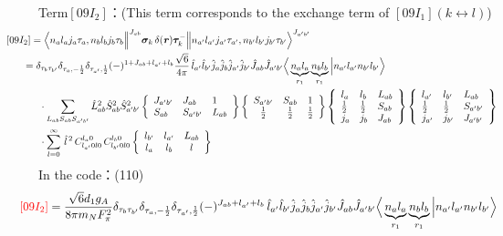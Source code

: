 \documentclass[master]{shnuthesis}
\newcommand{\bmr}{\textbf{\textit{r}}}
\newcommand{\ap}{a^\prime}
\newcommand{\bp}{b^\prime}
\newcommand{\il}{\!\!\!\!\!\!\!\!\!\!}
\newcommand{\ii}{\!\!\!\!\!\!\!\!\!\!\!\!\!\!\!\!\!\!\!\!}
\begin{document}
{\color{red}Term$[09I_2]$：}(This term corresponds to the exchange term of $[09I_1]$$(k \longleftrightarrow l)$)
\begin{align}
    &\ii [09I_2] = \Big\langle n_a l_a j_a \tau_a, n_b l_b j_b \tau_b \Big\|^{J_{ab}} \bm{\sigma}_k \,\delta(\bmr) \bm{\tau}_k^- \Big\| n_{\ap} l_{\ap} j_{\ap} \tau_{\ap}, n_{\bp} l_{\bp} j_{\bp} \tau_{\bp} \Big\rangle^{J_{\ap \bp}} \\
    &\il = \delta_{\tau_b \tau_{\bp}}\delta_{\tau_a, -\frac{1}{2}}\delta_{\tau_{\ap}, \frac{1}{2}} (-)^{1+J_{ab}+l_{\ap}+l_b}\frac{\sqrt{6}}{4\pi}\,\hat{l}_{\ap}\hat{l}_{\bp}\hat{j}_a\hat{j}_b\hat{j}_{\ap}\hat{j}_{\bp}\hat{J}_{ab}\hat{J}_{\ap\bp} \Big\langle \underbrace{n_a l_a}_{r_1} \underbrace{n_b l_b}_{r_1} \Big| n_{\ap} l_{\ap} n_{\bp} l_{\bp} \Big\rangle \notag \\
    & \cdot \sum_{L_{ab}S_{ab}S_{\ap\bp}} \hat{L}_{ab}^2\hat{S}_{ab}^2\hat{S}_{\ap\bp}^2  \left\{\begin{array}{lll} J_{\ap\bp} & J_{ab} & 1 \\ S_{ab} & S_{\ap\bp} & L_{ab} \end{array}\right\}    \left\{\begin{array}{ccc} S_{\ap\bp} & S_{ab} & 1 \\ \frac{1}{2} & \frac{1}{2} & \frac{1}{2} \end{array}\right\}  \left\{\begin{array}{lll}l_{a} & l_{b} & L_{ab} \\ \frac{1}{2} & \frac{1}{2} & S_{ab} \\j_{a} & j_{b} & J_{ab} \end{array}\right\}  \left\{\begin{array}{lll}l_{\ap} & l_{\bp} & L_{ab} \\ \frac{1}{2} & \frac{1}{2} & S_{\ap\bp} \\j_{\ap} & j_{\bp} & J_{\ap\bp} \end{array}\right\}  \notag\\
    & \cdot \sum_{l=0}^\infty \,\hat{l}^{\,2}\,C_{l_{\ap} 0 l 0}^{l_a 0} \,C_{l_{\bp} 0 l 0}^{l_b 0}  \left\{\begin{array}{ccc} l_{\bp} & l_{\ap} & L_{ab} \\ l_a & l_b & l \end{array}\right\}
\end{align}
In the code：(110)
\begin{align}
    &\il {\color{red} [09I_2]} = \frac{\sqrt{6}d_1 g_A}{8\pi m_N F_{\pi}^2} \delta_{\tau_b \tau_{\bp}}\delta_{\tau_a, -\frac{1}{2}}\delta_{\tau_{\ap}, \frac{1}{2}} (-)^{J_{ab}+l_{\ap}+l_b}\,\hat{l}_{\ap}\hat{l}_{\bp}\hat{j}_a\hat{j}_b\hat{j}_{\ap}\hat{j}_{\bp}\hat{J}_{ab}\hat{J}_{\ap\bp} \Big\langle \underbrace{n_a l_a}_{r_1} \underbrace{n_b l_b}_{r_1} \Big| n_{\ap} l_{\ap} n_{\bp} l_{\bp} \Big\rangle \notag \\

\end{align}$$
\end{document}

